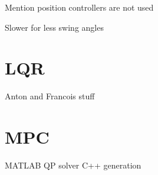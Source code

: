 {            Mention position controllers are not used

            Slower for less swing angles

    \FloatBarrier\section{LQR} \label{sec:lqr}

        Anton and Francois stuff

    \FloatBarrier\section{MPC} \label{sec:mpc}

        MATLAB
        QP solver
        C++ generation

} %

